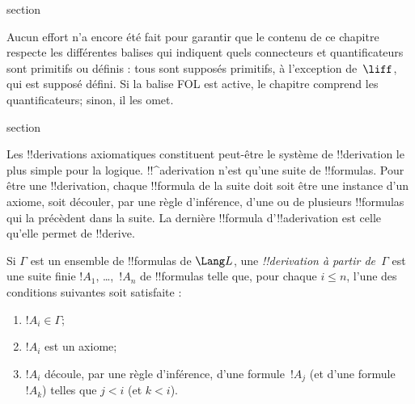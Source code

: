 \documentclass[11pt,a4paper,openany]{memoir}
\begin{document}
\endgroup



\OLEndChapterHook


\endgroup


\begingroup
\expandafter\def\csname ol@sectioncs\endcsname{section}
\def\olfilename{axiomatic-deduction}


      {}
      {}

\begin{editorial}
  Aucun effort n'a encore été fait pour garantir que le contenu de ce
  chapitre respecte les différentes balises qui indiquent quels
  connecteurs et quantificateurs sont primitifs ou définis : tous sont
  supposés primitifs, à l'exception de~$\liff$, qui est supposé défini.
  Si la balise FOL est active, le chapitre comprend les quantificateurs;
  sinon, il les omet.
\end{editorial}


\begingroup
\expandafter\def\csname ol@sectioncs\endcsname{section}
\def\olfilename{rules-and-proofs}


      {}
      {}


\begin{explain}
Les !!{derivation}s axiomatiques constituent peut-être le système de
!!{derivation} le plus simple pour la logique. !!^a{derivation} n'est
qu'une suite de !!{formula}s. Pour être une !!{derivation}, chaque
!!{formula} de la suite doit soit être une instance d'un axiome, soit
découler, par une règle d'inférence, d'une ou de plusieurs !!{formula}s
qui la précèdent dans la suite. La dernière !!{formula}
d'!!a{derivation} est celle qu'elle permet de !!{derive}.
\end{explain}

\begin{defn}[!!^{derivability}]
Si $\Gamma$ est un ensemble de !!{formula}s de $\Lang L$, une
\emph{!!{derivation} à partir de~$\Gamma$} est une suite finie
$!A_1$, \dots,~$!A_n$ de !!{formula}s telle que, pour chaque
$i \le n$, l'une des conditions suivantes soit satisfaite :
\begin{enumerate}
\item $!A_i \in \Gamma$;
\item $!A_i$ est un axiome;
\item $!A_i$ découle, par une règle d'inférence, d'une formule~$!A_j$
  (et d'une formule~$!A_k$) telles que $j < i$ (et $k < i$).
\end{enumerate}
\end{defn}
\end{document}
